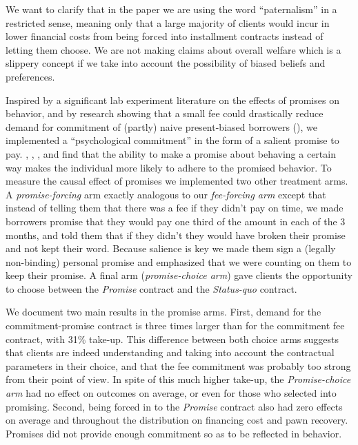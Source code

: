\documentclass[oneside,11pt]{article}
\begin{document}
We want to clarify that in the paper we are using the word ``paternalism'' in a restricted sense, meaning only that a large majority of clients would incur in lower financial costs from being forced into installment contracts instead of letting them choose. We are not making claims about overall welfare which is a slippery concept if we take into account the possibility of biased beliefs and preferences.

Inspired by a significant lab experiment literature on the effects of promises on behavior, and by research showing that a small fee could drastically reduce demand for commitment of (partly) naive present-biased borrowers (\cite{Laibson2015}), we implemented a ``psychological commitment'' in the form of a salient promise to pay.  \cite{PromisesPartnerships}, \cite{FurtherPromises}, \cite{Vanberg}, and \cite{Ismayilov2017} find that the ability to make a promise about behaving a certain way makes the individual more likely to adhere to the promised behavior. %
To measure the causal effect of promises we implemented two other treatment arms. A \textit{promise-forcing} arm exactly analogous to our \textit{fee-forcing arm} except that instead of telling them that there was a fee if they didn't pay on time, we made borrowers promise that they would pay one third of the amount in each of the 3 months, and told them that if they didn't they would have broken their promise and not kept their word. Because salience is key we made them sign a (legally non-binding) personal promise and emphasized that we were counting on them to keep their promise. A final arm (\textit{promise-choice arm}) gave clients the opportunity to choose between the \textit{Promise} contract and the \textit{Status-quo} contract.

We document two main results in the promise arms. First, demand for the commitment-promise contract is three times larger than for the commitment fee contract, with 31\% take-up. This difference between both choice arms suggests that clients are indeed understanding and taking into account the contractual parameters in their choice, and that the fee commitment was probably too strong from their point of view. In spite of this much higher take-up, the \textit{Promise-choice arm} had no effect on outcomes on average, or even for those who selected into promising. Second, being forced in to the \textit{Promise} contract also had zero effects on average and throughout the distribution on financing cost and pawn recovery. %
Promises did not provide enough commitment so as to be reflected in behavior.
\end{document}
